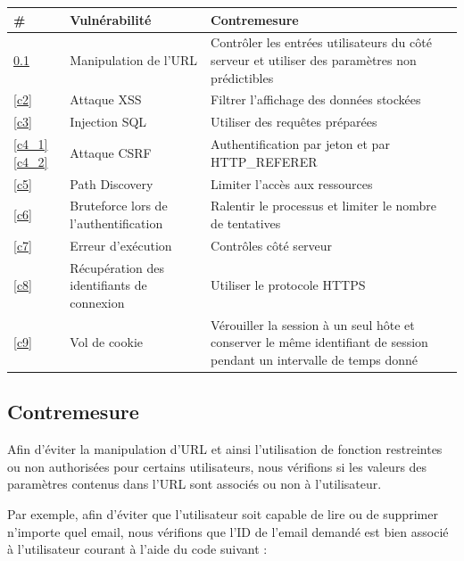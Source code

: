 \documentclass[12pt]{article}
\begin{document}
\begin{tabular}{| p{0.7cm} | p{7.5cm} | p{7.5cm} |}
  \hline			
  \textbf{\# } &\textbf{ Vulnérabilité }& \textbf{Contremesure} \\
  \hline  
  \ref{c1} & Manipulation de l'URL & Contrôler les entrées utilisateurs du côté serveur et utiliser des paramètres non prédictibles \\
  \hline
  \ref{c2} & Attaque XSS & Filtrer l'affichage des données stockées \\
  \hline
  \ref{c3} & Injection SQL & Utiliser des requêtes préparées \\
  \hline
  \ref{c4_1} \ref{c4_2} & Attaque CSRF & Authentification par jeton et par HTTP\_REFERER \\
  \hline
  \ref{c5} & Path Discovery & Limiter l'accès aux ressources \\
  \hline
  \ref{c6} & Bruteforce lors de l'authentification & Ralentir le processus et limiter le nombre de tentatives \\
  \hline
  \ref{c7} & Erreur d'exécution & Contrôles côté serveur \\
  \hline
  \ref{c8} & Récupération des identifiants de connexion & Utiliser le protocole HTTPS \\
  \hline
  \ref{c9} & Vol de cookie & Vérouiller la session à un seul hôte et conserver le même identifiant de session pendant un intervalle de temps donné \\
  \hline
\end{tabular}

\newpage
\subsection{Contremesure}\label{c1}

Afin d'éviter la manipulation d'URL et ainsi l'utilisation de fonction restreintes ou non authorisées pour certains utilisateurs, nous vérifions si les valeurs des paramètres contenus dans l'URL sont associés ou non à l'utilisateur. 

Par exemple, afin d'éviter que l'utilisateur soit capable de lire ou de supprimer n'importe quel email, nous vérifions que l'ID de l'email demandé est bien associé à l'utilisateur courant à l'aide du code suivant : 
\end{document}
